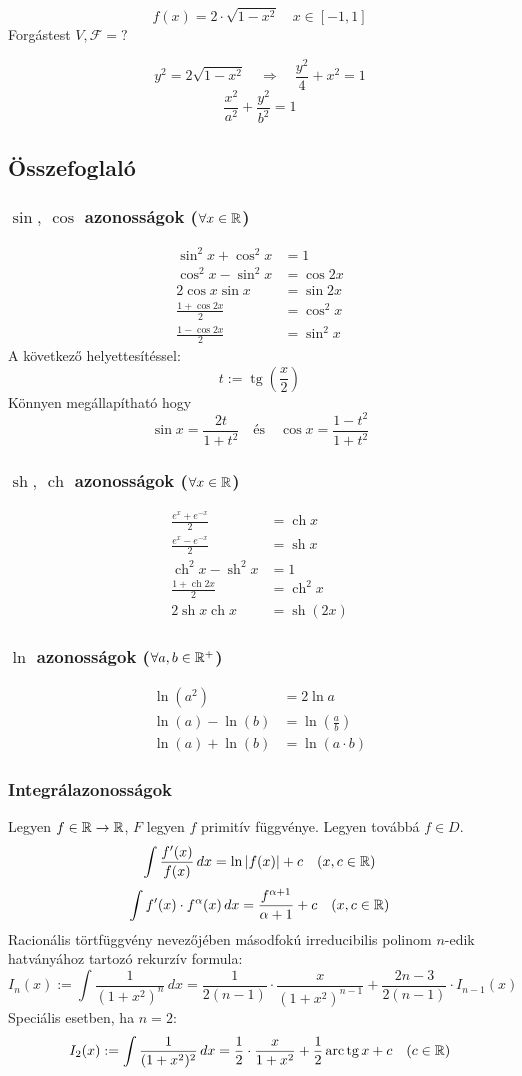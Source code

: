 \documentclass[a4paper,11.5pt]{article}
\DeclareMathOperator{\tg}{tg}
\DeclareMathOperator{\sh}{sh}
\DeclareMathOperator{\ch}{ch}
\DeclareMathOperator{\arc}{arc}
\begin{document}
	\begin{exercise}
		\[ f(x)=2\cdot\sqrt{1-x^2}\quad x\in[-1,1] \]
		Forgástest $V, \mathcal{F}=?$
		
		\[ y^2=2\sqrt{1-x^2}\quad \Rightarrow\quad \frac{y^2}{4}+x^2=1 \]
		\[ \frac{x^2}{a^2}+\frac{y^2}{b^2}=1 \]
	\end{exercise}
	\subsection{Összefoglaló}
	\subsubsection{$\sin, \ \cos$ azonosságok ($\forall x\in\mathbb{R}$)}
	\begin{align*}
		\sin^2x+\cos^2x&=1\\
		\cos^2x-\sin^2x&=\cos2x\\
		2\cos x\sin x&=\sin2x\\
		\frac{1+\cos2x}{2}&=\cos^2 x\\
		\frac{1-\cos2x}{2}&=\sin^2x
	\end{align*}
	A következő helyettesítéssel:
	\[  t:=\tg \left(\frac{x}{2}\right) \]
	Könnyen megállapítható hogy
	\[ \sin x=\frac{2t}{1+t^2}\quad \text{és}\quad  \cos x=\frac{1-t^2}{1+t^2} \]
	\subsubsection{$\sh, \ \ch$ azonosságok ($\forall x\in\mathbb{R}$)}
	\begin{align*}
		\frac{e^x+e^{-x}}{2}&=\ch x\\
		\frac{e^x-e^{-x}}{2}&=\sh x\\
		\ch^2x-\sh^2x&=1\\
		\frac{1+\ch2x}{2}&=\ch^2 x\\
		2\sh x\ch x&=\sh(2x)
	\end{align*}
	\subsubsection{$\ln$ azonosságok ($\forall a,b\in\mathbb{R}^+$)}
	\begin{align*}
		\ln(a^2)&=2\ln a\\
		\ln(a)-\ln(b)&=\ln\left(\frac{a}{b}\right)\\
		\ln(a)+\ln(b)&=\ln(a\cdot b)
	\end{align*}
	\subsubsection{Integrálazonosságok}
	Legyen $f\in\mathbb{R}\to\mathbb{R}$, $F$ legyen $f$ primitív függvénye. Legyen továbbá $f\in D$.
	\[ \int\frac{f'(x)}{f(x)}\,dx=\ln|f(x)|+c\quad (x,c\in\mathbb{R}) \]
	\[ \int f'(x)\cdot f^\alpha(x)\,dx=\frac{f^{\alpha+1}}{\alpha+1}+c\quad (x,c\in\mathbb{R}) \]
	Racionális törtfüggvény nevezőjében másodfokú irreducibilis polinom $n$-edik hatványához tartozó rekurzív formula:
	\[ I_n(x):=\int\frac{1}{(1+x^2)^n}\,dx=\frac{1}{2(n-1)}\cdot\frac{x}{(1+x^2)^{n-1}}+\frac{2n-3}{2(n-1)}\cdot I_{n-1}(x) \]
	Speciális esetben, ha $n=2$:
	\[ I_2(x):=\int\frac{1}{(1+x^2)^2}\,dx=\frac{1}{2}\cdot\frac{x}{1+x^2}+\frac{1}{2}\arc\tg x+c\quad (c\in\R) \]
\end{document}
